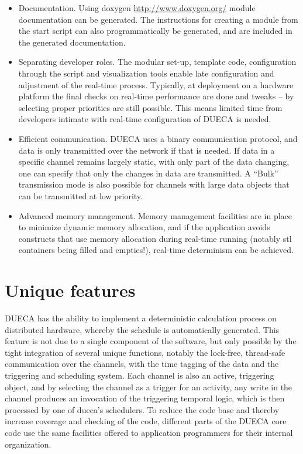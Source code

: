 \documentclass[11pt,a4paper,twoside]{scrartcl}
\begin{document}
\begin{itemize}
\item Documentation. Using doxygen \url{http://www.doxygen.org/} module documentation can be generated. The instructions for creating a module from the start script can also programmatically be generated, and are included in the generated documentation.
\item Separating developer roles. The modular set-up, template code, configuration through the script and visualization tools enable late configuration and adjustment of the real-time process. Typically, at deployment on a hardware platform the final checks on real-time performance are done and tweaks -- by selecting proper priorities are still possible. This means limited time from developers intimate with real-time configuration of DUECA is needed.
\item Efficient communication. DUECA uses a binary communication protocol, and data is only transmitted over the network if that is needed. If data in a specific channel remains largely static, with only part of the data changing, one can specify that only the changes in data are transmitted. A ``Bulk''  transmission mode is also possible for channels with large data objects that can be transmitted at low priority.
\item Advanced memory management. Memory management facilities are in place to minimize dynamic memory allocation, and if the application avoids constructs that use memory allocation during real-time running (notably stl containers being filled and empties!), real-time determinism can be achieved.
\end{itemize}


\section{Unique features}

DUECA has the ability to implement a deterministic calculation process on distributed hardware, whereby the schedule is automatically generated. This feature is not due to a single component of the software, but only possible by the tight integration of several unique functions, notably the lock-free, thread-safe communication over the channels, with the time tagging of the data and the triggering and scheduling system. Each channel is also an active, triggering object, and by selecting the channel as a trigger for an activity, any write in the channel produces an invocation of the triggering temporal logic, which is then processed by one of dueca's schedulers. To reduce the code base and thereby increase coverage and checking of the code, different parts of the DUECA core code use the same facilities offered to application programmers for their internal organization.
\end{document}
